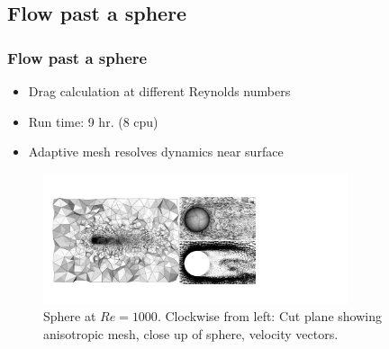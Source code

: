 \subsection{Flow past a sphere}

\begin{frame}
    \frametitle{Flow past a sphere}
\begin{itemize}
\item Drag calculation at different Reynolds numbers
\item Run time: 9 hr. (8 cpu)
\item Adaptive mesh resolves dynamics near surface
\end{itemize}
\begin{figure}
\centering
\includegraphics[width=0.8\textwidth]{./flow_past_sphere/sphere-Re1000-combined.pdf}
\caption{Sphere at $Re = 1000$. Clockwise from left: Cut plane showing anisotropic mesh, close up of sphere, velocity vectors.}
\end{figure}
\end{frame}

